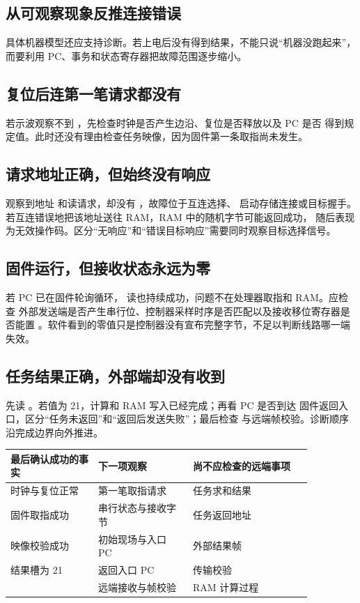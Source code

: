 \subsection{从可观察现象反推连接错误}

具体机器模型还应支持诊断。若上电后没有得到结果，不能只说“机器没跑起来”，而要利用
PC、事务和状态寄存器把故障范围逐步缩小。

\subsection{复位后连第一笔请求都没有}

若示波观察不到 ，先检查时钟是否产生边沿、复位是否释放以及 PC 是否
得到规定值。此时还没有理由检查任务映像，因为固件第一条取指尚未发生。

\subsection{请求地址正确，但始终没有响应}

观察到地址  和读请求，却没有 ，故障位于互连选择、
启动存储连接或目标握手。若互连错误地把该地址送往 RAM，RAM 中的随机字节可能返回成功，
随后表现为无效操作码。区分“无响应”和“错误目标响应”需要同时观察目标选择信号。

\subsection{固件运行，但接收状态永远为零}

若 PC 已在固件轮询循环， 读也持续成功，问题不在处理器取指和 RAM。应检查
外部发送端是否产生串行位、控制器采样时序是否匹配以及接收移位寄存器是否能置
。软件看到的零值只是控制器没有宣布完整字节，不足以判断线路哪一端
失效。

\subsection{任务结果正确，外部端却没有收到}

先读 。若值为 21，计算和 RAM 写入已经完成；再看 PC 是否到达
固件返回入口，区分“任务未返回”和“返回后发送失败”；最后检查
 与远端帧校验。诊断顺序沿完成边界向外推进。

\begin{longtable}{|L{0.25\linewidth}|L{0.27\linewidth}|L{0.34\linewidth}|}
\hline
{}
最后确认成功的事实 & 下一项观察 & 尚不应检查的远端事项 \\ \hline
时钟与复位正常 & 第一笔取指请求 & 任务求和结果 \\ \hline
固件取指成功 & 串行状态与接收字节 & 任务返回地址 \\ \hline
映像校验成功 & 初始现场与入口 PC & 外部结果帧 \\ \hline
结果槽为 21 & 返回入口 PC & 传输校验 \\ \hline
{} & 远端接收与帧校验 & RAM 计算过程 \\ \hline
\end{longtable}

